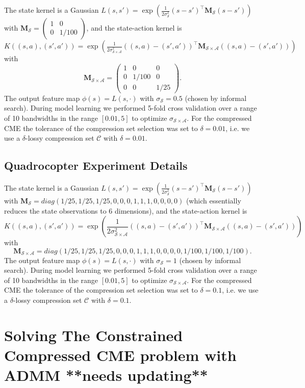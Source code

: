 \documentclass[letterpaper]{article}
\newcommand{\cC}{{\mathcal C}}
\newcommand{\cA}{{\mathcal A}}
\newcommand{\cS}{{\mathcal S}}
\newcommand{\bM}{{\bm M}}
\begin{document}
The state kernel is a Gaussian $L(s,s') = \exp\left({\frac{1}{2\sigma_{\cS}^2}(s - s')^\top \bM_\cS (s - s')}\right)$ with $\bM_\cS =\left( \begin{array}{cc}
1 & 0 \\
0 & 1/100  \end{array} \right)$, and the state-action kernel is  $K((s,a),(s',a')) = \exp\left({\frac{1}{2\sigma_{\cS\times\cA}^2}((s,a) - (s',a'))^\top \bM_{\cS\times\cA} ((s,a) - (s',a'))}\right)$ with
$$\bM_{\cS\times\cA} =\left( \begin{array}{ccc}
1 & 0 & 0\\
0 & 1/100 & 0\\
0 & 0 & 1/25\end{array} \right).$$ The output feature map $\phi(s) = L(s,\cdot)$ with $\sigma_{\cS} = 0.5$ (chosen by informal search). During model learning we performed 5-fold cross validation over a range of 10 bandwidths in the range $[0.01,5]$ to optimize $\sigma_{\cS\times\cA}$. For the compressed CME the tolerance of the compression set selection was set to $\delta = 0.01$, i.e. we use a $\delta$-lossy compression set $\cC$ with $\delta=0.01$.

\subsection{Quadrocopter Experiment Details}

The state kernel is a Gaussian $L(s,s') = \exp\left({\frac{1}{2\sigma_{\cS}^2}(s - s')^\top \bM_\cS (s - s')}\right)$ with $\bM_\cS =diag( 1/25 ,1/25 ,1/25, 0, 0, 0 ,1 ,1, 1, 0, 0, 0 ,0)$ (which essentially reduces the state observations to 6 dimensions), and the state-action kernel is $$K((s,a),(s',a')) = \exp\left({\frac{1}{2\sigma_{\cS\times\cA}^2}((s,a) - (s',a'))^\top \bM_{\cS\times\cA} ((s,a) - (s',a'))}\right)$$ with $$\bM_{\cS\times\cA} =diag( 1/25 ,1/25 ,1/25, 0, 0, 0 ,1 ,1, 1, 0, 0, 0 ,0,1/100,1/100,1/100).$$ The output feature map $\phi(s) = L(s,\cdot)$ with $\sigma_{\cS} = 1$ (chosen by informal search). During model learning we performed 5-fold cross validation over a range of 10 bandwidths in the range $[0.01,5]$ to optimize $\sigma_{\cS\times\cA}$. For the compressed CME the tolerance of the compression set selection was set to $\delta = 0.1$, i.e. we use a $\delta$-lossy compression set $\cC$ with $\delta=0.1$.




\iffalse


\section{Solving The Constrained Compressed CME problem with ADMM **needs updating**}\label{ConstCompSol}
\end{document}
